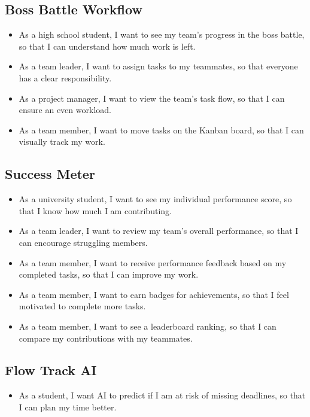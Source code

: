 \subsection{Boss Battle Workflow}
\begin{itemize}
    \item As a high school student, I want to see my team’s progress in the boss battle, so that I can understand how much work is left.
    \item As a team leader, I want to assign tasks to my teammates, so that everyone has a clear responsibility.
    \item As a project manager, I want to view the team’s task flow, so that I can ensure an even workload.
    \item As a team member, I want to move tasks on the Kanban board, so that I can visually track my work.
\end{itemize}

\subsection{Success Meter}
\begin{itemize}
    \item As a university student, I want to see my individual performance score, so that I know how much I am contributing.
    \item As a team leader, I want to review my team’s overall performance, so that I can encourage struggling members.
    \item As a team member, I want to receive performance feedback based on my completed tasks, so that I can improve my work.
    \item As a team member, I want to earn badges for achievements, so that I feel motivated to complete more tasks.
    \item As a team member, I want to see a leaderboard ranking, so that I can compare my contributions with my teammates.
\end{itemize}

\subsection{Flow Track AI}
\begin{itemize}
    \item As a student, I want AI to predict if I am at risk of missing deadlines, so that I can plan my time better.
\end{itemize}

